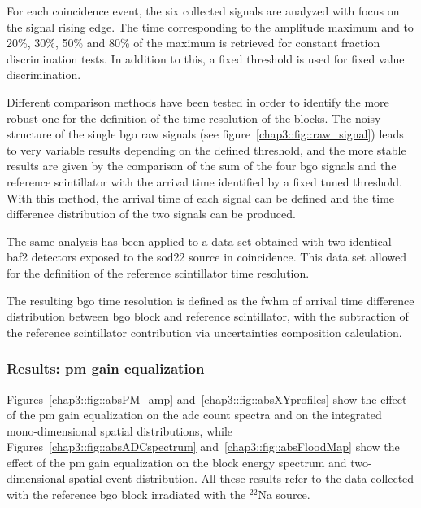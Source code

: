 For each coincidence event, the six collected signals are analyzed with focus on the signal rising edge. The time corresponding to the amplitude maximum and to 20\%, 30\%, 50\% and 80\% of the maximum is retrieved for constant fraction discrimination tests. In addition to this, a fixed threshold is used for fixed value discrimination.

Different comparison methods have been tested in order to identify the more robust one for the definition of the time resolution of the blocks. The noisy structure of the single \gls{bgo} raw signals (see figure~\ref{chap3::fig::raw_signal})  leads to very variable results depending on the defined threshold, and the more stable results are given by the comparison of the sum of the four \gls{bgo} signals and the reference scintillator with the arrival time identified by a fixed tuned threshold. With this method, the arrival time of each signal can be defined and the time difference distribution of the two signals can be produced.

The same analysis has been applied to a data set obtained with two identical \gls{baf2} detectors exposed to the \gls{sod22} source in coincidence. This data set allowed for the definition of the reference scintillator time resolution.

The resulting \gls{bgo} time resolution is defined as the \gls{fwhm} of arrival time difference distribution between \gls{bgo} block and reference scintillator, with the subtraction of the reference scintillator contribution via uncertainties composition calculation.



\subsubsection{Results: \gls{pm} gain equalization}\label{chap3::subsubsec::absPMgainCal}
Figures~\ref{chap3::fig::absPM_amp} and~\ref{chap3::fig::absXYprofiles} show the effect of the \gls{pm} gain equalization on the \gls{adc} count spectra and on the integrated mono-dimensional spatial distributions, while Figures~\ref{chap3::fig::absADCspectrum} and~\ref{chap3::fig::absFloodMap}  show the effect of the \gls{pm} gain equalization on the block energy spectrum and two-dimensional spatial event distribution. All these results refer to the data collected with the reference \gls{bgo} block irradiated with the $^{22}$Na source.

